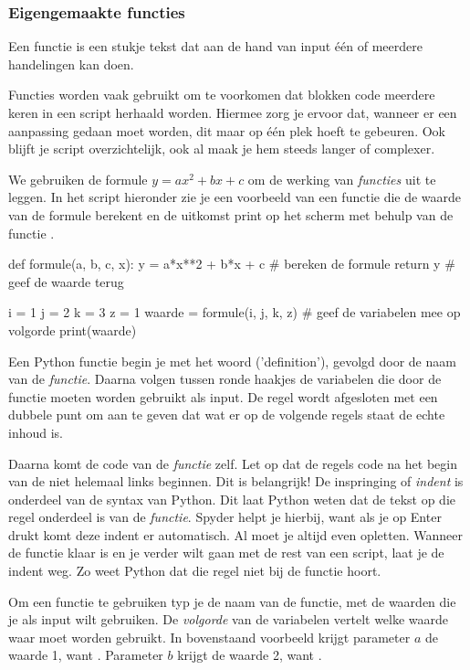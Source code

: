 \documentclass[a4paper,11pt, fleqn]{article}
\begin{document}
\subsubsection{Eigengemaakte functies}
Een functie is een stukje tekst dat aan de hand van input \'e\'en of meerdere handelingen kan doen.

Functies worden vaak gebruikt om te voorkomen dat blokken code meerdere keren in een script herhaald worden. 
Hiermee zorg je ervoor dat, wanneer er een aanpassing gedaan moet worden, dit maar op \'e\'en plek hoeft te gebeuren. 
Ook blijft je script overzichtelijk, ook al maak je hem steeds langer of complexer. 

We gebruiken de formule $y = a x^2+b x + c$ om de werking van \textit{functies} uit te leggen. In het script hieronder zie je een voorbeeld van een functie die de waarde van de formule berekent en de uitkomst print op het scherm met behulp van de functie .

\begin{python}
def formule(a, b, c, x):
    y = a*x**2 + b*x + c   # bereken de formule
    return y               # geef de waarde terug

i = 1
j = 2
k = 3
z = 1
waarde = formule(i, j, k, z) # geef de variabelen mee op volgorde
print(waarde)
\end{python} 

Een Python functie begin je met het woord  ('definition'), gevolgd door de naam van de \textit{functie}. Daarna volgen tussen ronde haakjes de variabelen die door de functie moeten worden gebruikt als input. De regel wordt afgesloten met een dubbele punt om aan te geven dat wat er op de volgende regels staat de echte inhoud is. 

Daarna komt de code van de \textit{functie} zelf. Let op dat de regels code na het begin van de  niet helemaal links beginnen. Dit is belangrijk! De inspringing of \textit{indent} is onderdeel van de syntax van Python. Dit laat Python weten dat de tekst op die regel onderdeel is van de \textit{functie}. Spyder helpt je hierbij, want als je op Enter drukt komt deze indent er automatisch. Al moet je altijd even opletten. Wanneer de functie klaar is en je verder wilt gaan met de rest van een script, laat je de indent weg. Zo weet Python dat die regel niet bij de functie hoort.

Om een functie te gebruiken typ je de naam van de functie, met de waarden die je als input wilt gebruiken. De \textit{volgorde} van de variabelen vertelt welke waarde waar moet worden gebruikt. 
In bovenstaand voorbeeld krijgt parameter $a$ de waarde 1, want . Parameter $b$ krijgt de waarde 2, want .
\end{document}
